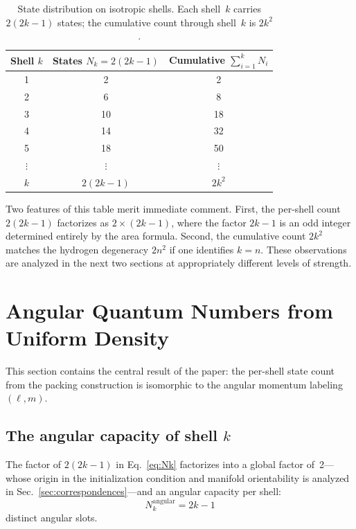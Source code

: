 \documentclass[aps,prl,reprint,amsmath,amssymb]{revtex4-2}
\begin{document}
\begin{table}[h]
\centering
\begin{tabular}{ccc}
\toprule
Shell $k$ & States $N_k = 2(2k-1)$ & Cumulative $\sum_{i=1}^{k} N_i$ \\
\midrule
1 & 2  & 2  \\
2 & 6  & 8  \\
3 & 10 & 18 \\
4 & 14 & 32 \\
5 & 18 & 50 \\
$\vdots$ & $\vdots$ & $\vdots$ \\
$k$ & $2(2k-1)$ & $2k^2$ \\
\bottomrule
\end{tabular}
\caption{State distribution on isotropic shells.  Each shell~$k$
  carries $2(2k-1)$ states; the cumulative count through shell~$k$ is
  $2k^2$.}
\label{tab:packing}
\end{table}

Two features of this table merit immediate comment.  First, the
per-shell count $2(2k-1)$ factorizes as $2 \times (2k-1)$, where the
factor $2k-1$ is an odd integer determined entirely by the area
formula.  Second, the cumulative count $2k^2$ matches the hydrogen
degeneracy $2n^2$ if one identifies $k = n$.  These observations are
analyzed in the next two sections at appropriately different levels of
strength.


\section{Angular Quantum Numbers from Uniform Density}
\label{sec:angular}

This section contains the central result of the paper: the per-shell
state count from the packing construction is isomorphic to the angular
momentum labeling $(\ell, m)$.

\subsection{The angular capacity of shell $k$}

The factor of $2(2k-1)$ in Eq.~\eqref{eq:Nk} factorizes into a
global factor of~2---whose origin in the initialization condition and
manifold orientability is analyzed in
Sec.~\ref{sec:correspondences}---and an angular capacity per shell:
\begin{equation}
  N_k^{\mathrm{angular}} = 2k - 1
  \label{eq:angular-capacity}
\end{equation}
distinct angular slots.
\end{document}
